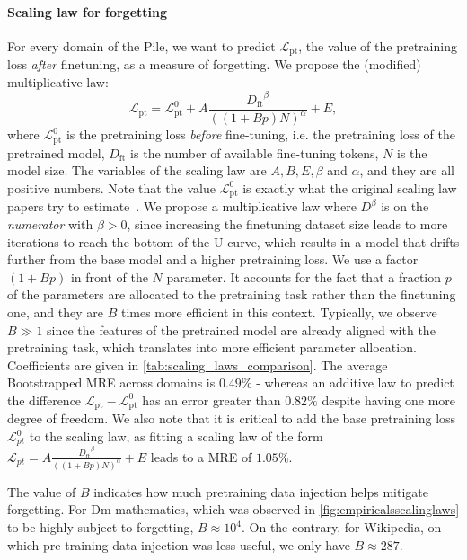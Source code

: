 \paragraph{Scaling law for forgetting} For every domain of the Pile, we want to predict $\mathcal{L}_{\mathrm{pt}}$, the value of the pretraining loss \emph{after} finetuning, as a measure of forgetting. We propose the (modified) multiplicative law:
\begin{equation}
\mathcal{L}_{\mathrm{pt}} 
    =\mathcal{L}_{\mathrm{pt}}^0 + A\frac{{D_{\mathrm{ft}}}^{\beta}}{((1+{B}{p})N)^{\alpha}} + E,    
\end{equation}
where $\mathcal{L}_{\mathrm{pt}}^0$ is the pretraining loss \emph{before} fine-tuning, i.e. the pretraining loss of the pretrained model, $D_\mathrm{ft}$ is the number of available fine-tuning tokens, $N$ is the model size.
The variables of the scaling law are $A, B, E, \beta$ and $\alpha$, and they are all positive numbers.
Note that the value $\mathcal{L}_{\mathrm{pt}}^0$ is exactly what the original scaling law papers try to estimate~\citep{kaplan2020scaling,DBLP:journals/corr/abs-2203-15556}. We propose a multiplicative law where $D^{\beta}$ is on the \emph{numerator} with $\beta>0$, since increasing the finetuning dataset size leads to more iterations to reach the bottom of the U-curve, which results in a model that drifts further from the base model and a higher pretraining loss. We use a factor $(1+Bp)$ in front of the $N$ parameter. It accounts for the fact that a fraction $p$ of the parameters are allocated to the pretraining task rather than the finetuning one, and they are $B$ times more efficient in this context. Typically, we observe $B\gg 1$ since the features of the pretrained model are already aligned with the pretraining task, which translates into more efficient parameter allocation. Coefficients are given in \autoref{tab:scaling_laws_comparison}. The average Bootstrapped MRE across domains is $\bm{0.49\%}$ - whereas an additive law to predict the difference $\mathcal{L}_{\mathrm{pt}} - \mathcal{L}_{\mathrm{pt}}^0$ has an error greater than $0.82\%$ despite having one more degree of freedom.  
We also note that it is critical to add the base pretraining loss $\mathcal{L}_{pt}^0$ to the scaling law, as fitting a scaling law of the form $\mathcal{L}_{pt}= A\frac{{D_{\mathrm{ft}}}^{\beta}}{((1+{B}{p})N)^{\alpha}} + E$ leads to a MRE of $1.05\%$.  
  
The value of $B$ indicates how much pretraining data injection helps mitigate forgetting. For Dm mathematics, which was observed in \autoref{fig:empiricalsscalinglaws} to be highly subject to forgetting, $B\approx 10^4$. On the contrary, for Wikipedia, on which pre-training data injection was less useful, we only have $B\approx 287$.  

